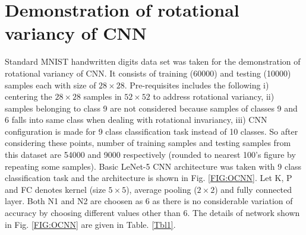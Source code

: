 \section{Demonstration of rotational variancy of CNN}
\label{SecDemRVarCNN}
 Standard MNIST handwritten digits data set \cite{RCNN40} was taken for the demonstration of rotational variancy of CNN. 
 It consists of training (60000) and testing (10000) samples each with size of $28\times28$.  Pre-requisites includes the following i) centering the $28\times28$ samples in $52\times52$ to address rotational variancy, ii) samples belonging to class 9 are not considered because samples of classes 9 and 6 falls into same class when dealing with rotational invariancy, iii) CNN configuration is made for 9 class classification task instead of 10 classes. So after considering these points, number of training samples and testing samples from this dataset are 54000 and 9000 respectively (rounded to nearest 100's figure by repeating some samples). Basic LeNet-5 CNN architecture was taken with 9 class classification task and the architecture is shown in Fig. \ref{FIG:OCNN}. Let K, P and FC denotes kernel (size $5\times5$), average pooling ($2\times2$) and fully connected layer. Both N1 and N2 are choosen as 6 as there is no considerable variation of accuracy by choosing different values other than 6. The details of network shown in Fig. \ref{FIG:OCNN} are given in Table. \ref{Tbl1}.\\

 
